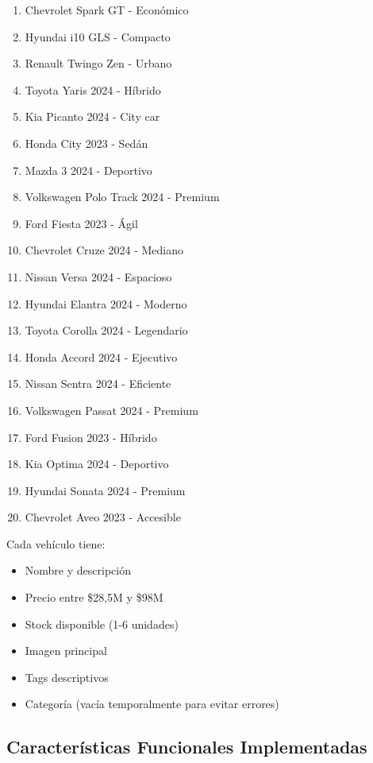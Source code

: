 \documentclass[12pt,a4paper]{article}
\begin{document}
\begin{enumerate}
    \item Chevrolet Spark GT - Económico
    \item Hyundai i10 GLS - Compacto
    \item Renault Twingo Zen - Urbano
    \item Toyota Yaris 2024 - Híbrido
    \item Kia Picanto 2024 - City car
    \item Honda City 2023 - Sedán
    \item Mazda 3 2024 - Deportivo
    \item Volkswagen Polo Track 2024 - Premium
    \item Ford Fiesta 2023 - Ágil
    \item Chevrolet Cruze 2024 - Mediano
    \item Nissan Versa 2024 - Espacioso
    \item Hyundai Elantra 2024 - Moderno
    \item Toyota Corolla 2024 - Legendario
    \item Honda Accord 2024 - Ejecutivo
    \item Nissan Sentra 2024 - Eficiente
    \item Volkswagen Passat 2024 - Premium
    \item Ford Fusion 2023 - Híbrido
    \item Kia Optima 2024 - Deportivo
    \item Hyundai Sonata 2024 - Premium
    \item Chevrolet Aveo 2023 - Accesible
\end{enumerate}

Cada vehículo tiene:
\begin{itemize}
    \item Nombre y descripción
    \item Precio entre \$28,5M y \$98M
    \item Stock disponible (1-6 unidades)
    \item Imagen principal
    \item Tags descriptivos
    \item Categoría (vacía temporalmente para evitar errores)
\end{itemize}

\subsection{Características Funcionales Implementadas}
\end{document}
